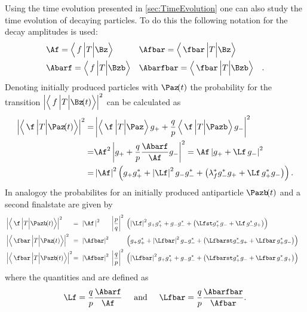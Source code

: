 Using the time evolution presented in \cref{sec:TimeEvolution} one can also study the time evolution of decaying particles.
To do this the following notation for the decay amplitudes is used:
\begin{equation}
\begin{aligned}
&\Af = \left<\,f\,\Big|T\Big|\Bz\right>&&\Afbar = \left<\,\fbar\,\Big|T\Big|\Bz\right>&\\
&\Abarf = \left<\,f\,\Big|T\Big|\Bzb\right>&&\Abarfbar = \left<\,\fbar\,\Big|T\Big|\Bzb\right>&.
\end{aligned}
\end{equation}
Denoting initially produced particles with $\Paz\!(t)$ the probability for the transition $\left|\left<\,f\,\Big|T\Big|\Bz\!(t)\right>\right|^2$ can be calculated as
\begin{align}
\left|\left<\,\f\,\Big|T\Big|\Paz\!(t)\right>\right|^2 =&
\left|\left<\,\f\,\Big|T\Big|\Paz\right>g_++\frac{q}{p}\left<\,\f\,\Big|T\Big|\Pazb\right>g_-\right|^2\nonumber\\
=&\Af^2\left|g_+ + \frac{q}{p}\frac{\Abarf}{\Af} g_-\right|^2=\Af\left|g_+ +\Lf\,g_-\right|^2\nonumber\\
=&\left|\Af\right|^2\left(g_+g_+^*+\left|\Lf\right|^2g_-g_-^*+\left(\lambda_{f}^*g_-^*g_+ + \Lf\,g_+^* g_-\right)\right).
\end{align}
In analogoy the probabilites for an initially produced antiparticle $\Pazb\!(t)$ and a second finalstate \fbar are given by
\begin{align}
&\left|\left<\,\f\,\Big|T\Big|\Pazb\!(t)\right>\right|^2&\kern -8.5pt{=}
&\kern 6.0pt{\left|\Af\,\right|^2}&&\kern -5.5pt{\left|\frac{p}{q}\right|^2}& &\kern -5.5pt{\left(\left|\Lf\right|^2g_+g_+^*+g_-g_-^*+\left(\Lfst g_+^*g_- + \Lf\,g_-^* g_+\right)\right)}&\\
&\left|\left<\,\fbar\,\Big|T\Big|\Paz\!(t)\right>\right|^2&\kern -8.5pt{=}
&\kern 6.0pt{\left|\Afbar\right|^2}& && &\kern -5.5pt{\left(g_+g_+^*+\left|\Lfbar\right|^2g_-g_-^*+\left(\Lfbarst g_-^*g_+ + \Lfbar\,g_+^* g_-\right)\right)}&\\
&\left|\left<\,\fbar\,\Big|T\Big|\Pazb\!(t)\right>\right|^2&\kern -8.5pt{=}
&\kern 6.0pt{\left|\Afbar\right|^2}& &\kern -5.5pt{\left|\frac{q}{p}\right|^2}& &\kern -5.5pt{\left(\left|\Lfbar\right|^2g_+g_+^*+g_-g_-^*+\left(\Lfbarst g_+^*g_- + \Lfbar\,g_-^* g_+\right)\right)}&
\end{align}
where the quantities \Lf and \Lfbar are defined as
\begin{equation}
\Lf=\frac{q}{p}\frac{\Abarf}{\Af}\hspace{0.5cm}\text{and}
\hspace{0.5cm}\Lfbar=\frac{q}{p}\frac{\Abarfbar}{\Afbar}.
\end{equation}
